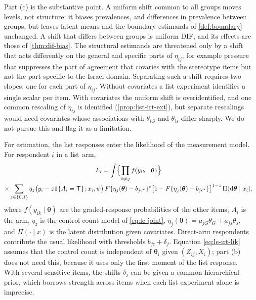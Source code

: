 Part (c) is the substantive point. A uniform shift common to all groups moves levels, not structure: it biases prevalences, and differences in prevalence between groups, but leaves latent means and the boundary estimands of \cref{def:boundary} unchanged. A shift that differs between groups is uniform DIF, and its effects are those of \cref{thm:dif-bias}. The structural estimands are threatened only by a shift that acts differently on the general and specific parts of $\eta_{ij}$, for example pressure that suppresses the part of agreement that covaries with the stereotype items but not the part specific to the Israel domain. Separating such a shift requires two slopes, one for each part of $\eta_{ij}$. Without covariates a list experiment identifies a single scalar per item. With covariates the uniform shift is overidentified, and one common rescaling of $\eta_{ij}$ is identified (\cref{prop:list-irt-ext}), but separate rescalings would need covariates whose associations with $\theta_{iG}$ and $\theta_{is}$ differ sharply. We do not pursue this and flag it as a limitation.

For estimation, the list responses enter the likelihood of the measurement model. For respondent $i$ in a list arm,
\begin{multline}\label{eq:le-irt-lik}
  L_i=\int\Bigl\{\prod_{k\ne j}f(y_{ik}\mid\bm\theta)\Bigr\}\\
  \times\sum_{z\in\{0,1\}}q_z\bigl(y_i-z\mathbf{1}\!\left\{A_i=\mathsf{T}\right\};x_i,\psi\bigr)\,F\{\eta_j(\bm\theta)-b_{jc^*}\}^z\bigl[1-F\{\eta_j(\bm\theta)-b_{jc^*}\}\bigr]^{1-z}\,\Pi(\mathrm d\bm\theta\mid x_i),
\end{multline}
where $f(y_{ik}\mid\bm\theta)$ are the graded-response probabilities of the other items, $A_i$ is the arm, $q_z$ is the control-count model of \eqref{eq:le-joint}, $\eta_j(\bm\theta)=a_{jG}\theta_G+a_{js}\theta_s$, and $\Pi(\cdot\mid x)$ is the latent distribution given covariates. Direct-arm respondents contribute the usual likelihood with thresholds $b_{jc}+\delta_j$. Equation \eqref{eq:le-irt-lik} assumes that the control count is independent of $\bm\theta_i$ given $(Z_{ij},X_i)$; part (b) does not need this, because it uses only the first moment of the list response. With several sensitive items, the shifts $\delta_j$ can be given a common hierarchical prior, which borrows strength across items when each list experiment alone is imprecise.
